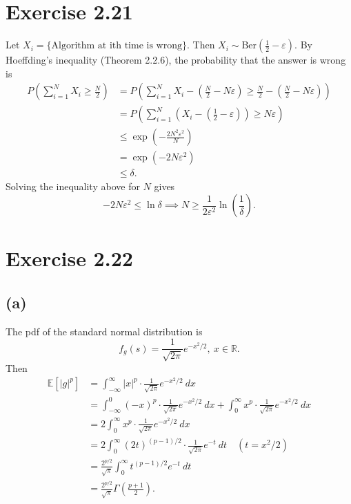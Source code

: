 \newpage
\section*{Exercise 2.21}
Let $X_i = \{ \text{Algorithm at ith time is wrong} \}$. Then $X_i \sim \mathrm{Ber}(\frac{1}{2} - 
\varepsilon)$. By Hoeffding's inequality (Theorem 2.2.6), the probability that the answer is wrong is 
\begin{align*}
	P \left( \sum_{i = 1}^{N} X_i \geq \frac{N}{2} \right) 
	&= P \left( \sum_{i = 1}^{N} X_i - \left( \frac{N}{2} - N \varepsilon \right) \geq \frac{N}{2} - 
	\left( \frac{N}{2} - N \varepsilon \right) \right) \\
	&= P \left( \sum_{i = 1}^{N}\left( X_i - \left( \frac{1}{2} - \varepsilon \right) \right) \geq 
	N \varepsilon \right) \\
	&\leq \exp{\left( -\frac{2N^2 \varepsilon^2}{N} \right)} \\
	&= \exp{(-2N \varepsilon^2)} \\
	&\leq \delta.
\end{align*}
Solving the inequality above for $N$ gives 
\[ -2N \varepsilon^2 \leq \ln{\delta} \implies N \geq \frac{1}{2 \varepsilon^2}\ln{\left( \frac{1}{\delta} 
\right)}. \]


\newpage
\section*{Exercise 2.22}
\subsection*{(a)}
The pdf of the standard normal distribution is 
\[ f_g(s) = \frac{1}{\sqrt{2 \pi}} e^{-x^2 / 2}, \ x \in \mathbb{R}. \]
Then 
\begin{align*}
	\mathbb{E}\left[ |g|^p \right] 
	&= \int_{-\infty}^{\infty} |x|^p \cdot \frac{1}{\sqrt{2 \pi}} e^{-x^2 / 2} \ dx \\
	&= \int_{-\infty}^{0} (-x)^p \cdot \frac{1}{\sqrt{2 \pi}} e^{-x^2 / 2} \ dx 
	+ \int_{0}^{\infty} x^p \cdot \frac{1}{\sqrt{2 \pi}} e^{-x^2 / 2} \ dx \\
	&= 2 \int_{0}^{\infty} x^p \cdot \frac{1}{\sqrt{2 \pi}} e^{-x^2 / 2} \ dx \\
	&= 2 \int_{0}^{\infty} (2t)^{(p - 1)/2} \cdot \frac{1}{\sqrt{2 \pi}} e^{-t} \ dt \quad (t = x^2/2) \\
	&= \frac{2^{p/2}}{\sqrt{\pi}} \int_{0}^{\infty} t^{(p - 1)/2} e^{-t} \ dt \\
	&= \frac{2^{p/2}}{\sqrt{\pi}} \Gamma \left( \frac{p + 1}{2} \right).
\end{align*}

